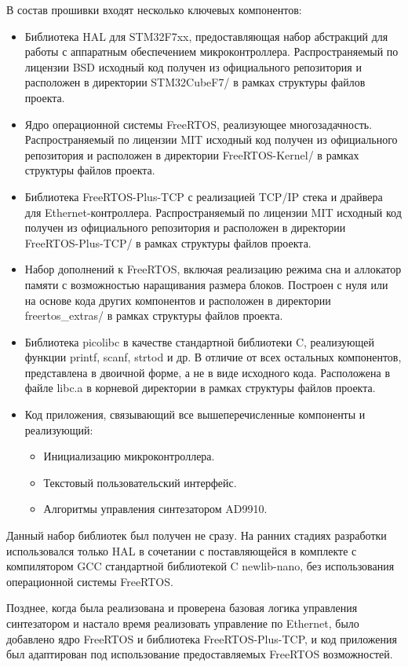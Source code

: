 \documentclass[rusmathsym, eqnumwithinsec, amspack, hyperref]{bomgost}
\begin{document}
В состав прошивки входят несколько ключевых компонентов:

\begin{itemize}
	\item Библиотека HAL для STM32F7xx, предоставляющая набор абстракций для работы с аппаратным обеспечением микроконтроллера. Распространяемый по лицензии BSD исходный код получен из официального репозитория и расположен в директории STM32CubeF7/ в рамках структуры файлов проекта.
	\item Ядро операционной системы FreeRTOS, реализующее многозадачность. Распространяемый по лицензии MIT исходный код получен из официального репозитория и расположен в директории FreeRTOS-Kernel/ в рамках структуры файлов проекта.
	\item Библиотека FreeRTOS-Plus-TCP с реализацией TCP/IP стека и драйвера для Ethernet-контроллера. Распространяемый по лицензии MIT исходный код получен из официального репозитория и расположен в директории FreeRTOS-Plus-TCP/ в рамках структуры файлов проекта.
	\item Набор дополнений к FreeRTOS, включая реализацию режима сна и аллокатор памяти с возможностью наращивания размера блоков. Построен с нуля или на основе кода других компонентов и расположен в директории freertos\_extras/ в рамках структуры файлов проекта.
	\item Библиотека picolibc в качестве стандартной библиотеки C, реализующей функции printf, scanf, strtod и др. В отличие от всех остальных компонентов, представлена в двоичной форме, а не в виде исходного кода. Расположена в файле libc.a в корневой директории в рамках структуры файлов проекта.
	\item Код приложения, связывающий все вышеперечисленные компоненты и реализующий:
	\begin{itemize}
		\item Инициализацию микроконтроллера.
		\item Текстовый пользовательский интерфейс.
		\item Алгоритмы управления синтезатором AD9910.
	\end{itemize}
\end{itemize}

Данный набор библиотек был получен не сразу. На ранних стадиях разработки использовался только HAL в сочетании с поставляющейся в комплекте с компилятором GCC стандартной библиотекой C newlib-nano, без использования операционной системы FreeRTOS.

Позднее, когда была реализована и проверена базовая логика управления синтезатором и настало время реализовать управление по Ethernet, было добавлено ядро FreeRTOS и библиотека FreeRTOS-Plus-TCP, и код приложения был адаптирован под использование предоставляемых FreeRTOS возможностей.
\end{document}
